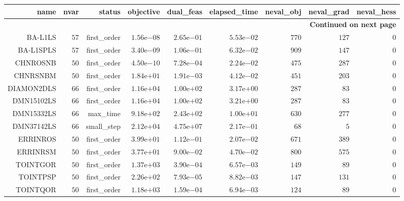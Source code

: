 \begin{longtable}{rrrrrrrrr}
\hline
name & nvar & status & objective & dual\_feas & elapsed\_time & neval\_obj & neval\_grad & neval\_hess \\\hline
\endhead
\hline
\multicolumn{9}{r}{{\bfseries Continued on next page}}\\
\hline
\endfoot
\endlastfoot
BA-L1LS & \(    57\) & first\_order & \( 1.56\)e\(-08\) & \( 2.65\)e\(-01\) & \( 5.53\)e\(-02\) & \(   770\) & \(   127\) & \(     0\) \\
BA-L1SPLS & \(    57\) & first\_order & \( 3.40\)e\(-09\) & \( 1.06\)e\(-01\) & \( 6.32\)e\(-02\) & \(   909\) & \(   147\) & \(     0\) \\
CHNROSNB & \(    50\) & first\_order & \( 4.50\)e\(-10\) & \( 7.28\)e\(-04\) & \( 2.24\)e\(-02\) & \(   475\) & \(   287\) & \(     0\) \\
CHNRSNBM & \(    50\) & first\_order & \( 1.84\)e\(+01\) & \( 1.91\)e\(-03\) & \( 4.12\)e\(-02\) & \(   451\) & \(   203\) & \(     0\) \\
DIAMON2DLS & \(    66\) & first\_order & \( 1.16\)e\(+04\) & \( 1.00\)e\(+02\) & \( 3.17\)e\(+00\) & \(   287\) & \(    83\) & \(     0\) \\
DMN15102LS & \(    66\) & first\_order & \( 1.16\)e\(+04\) & \( 1.00\)e\(+02\) & \( 3.21\)e\(+00\) & \(   287\) & \(    83\) & \(     0\) \\
DMN15332LS & \(    66\) & max\_time & \( 9.18\)e\(+02\) & \( 2.43\)e\(+02\) & \( 1.00\)e\(+01\) & \(   630\) & \(   277\) & \(     0\) \\
DMN37142LS & \(    66\) & small\_step & \( 2.12\)e\(+04\) & \( 4.75\)e\(+07\) & \( 2.17\)e\(-01\) & \(    68\) & \(     5\) & \(     0\) \\
ERRINROS & \(    50\) & first\_order & \( 3.99\)e\(+01\) & \( 1.12\)e\(-01\) & \( 2.07\)e\(-02\) & \(   671\) & \(   389\) & \(     0\) \\
ERRINRSM & \(    50\) & first\_order & \( 3.77\)e\(+01\) & \( 9.00\)e\(-02\) & \( 4.70\)e\(-02\) & \(   800\) & \(   575\) & \(     0\) \\
TOINTGOR & \(    50\) & first\_order & \( 1.37\)e\(+03\) & \( 3.90\)e\(-04\) & \( 6.57\)e\(-03\) & \(   149\) & \(    89\) & \(     0\) \\
TOINTPSP & \(    50\) & first\_order & \( 2.26\)e\(+02\) & \( 7.93\)e\(-05\) & \( 8.82\)e\(-03\) & \(   147\) & \(   131\) & \(     0\) \\
TOINTQOR & \(    50\) & first\_order & \( 1.18\)e\(+03\) & \( 1.59\)e\(-04\) & \( 6.94\)e\(-03\) & \(   124\) & \(    89\) & \(     0\) \\\hline
\end{longtable}

